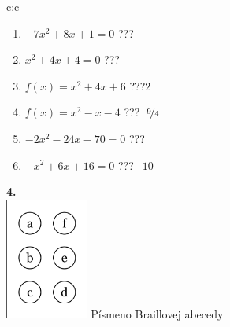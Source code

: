 \documentclass[10pt]{report}
\begin{document}
\begin{tabular}{c:c}
\begin{minipage}[c][104.5mm][t]{0.5\linewidth}
\begin{center}
\begin{minipage}{0.79\linewidth}
\begin{center}
\begin{varwidth}{\linewidth}
\begin{enumerate}
\Large
\item $-7x^2+8x+1=0$\quad \dotfill\; ???\;\dotfill {}
\item $x^2+4x+4=0$\quad \dotfill\; ???\;\dotfill {}
\item $f(x)=x^2+4x+6$\quad \dotfill\; ???\;\dotfill \quad $2$
\item $f(x)=x^2-x-4$\quad \dotfill\; ???\;\dotfill \quad $\nicefrac{-9}{4}$
\item $-2x^2-24x-70=0$\quad \dotfill\; ???\;\dotfill {}
\item $-x^2+6x+16=0$\quad \dotfill\; ???\;\dotfill \quad $-10$
\end{enumerate}
\end{varwidth}
\end{center}
\end{minipage}
\begin{minipage}{0.20\linewidth}
\begin{center}
{\Huge\bfseries 4.} \\[2mm]
\includegraphics[height=40mm]{../images/braille.png}
{\small Písmeno Braillovej abecedy}
\end{center}
\end{minipage}
\end{center}
\end{minipage}
%
\end{tabular}
\newpage
\thispagestyle{empty}
\end{document}
